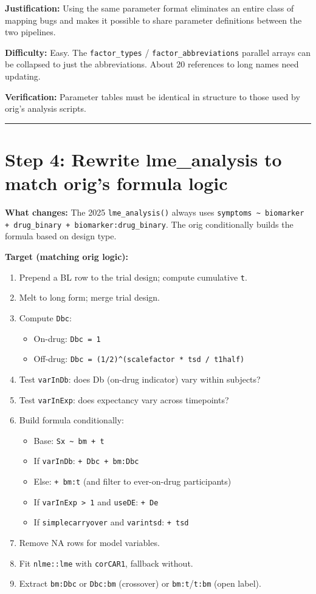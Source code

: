 \documentclass[11pt]{article}
\begin{document}
\textbf{Justification:} Using the same parameter format eliminates an
entire class of mapping bugs and makes it possible to share
parameter definitions between the two pipelines.

\textbf{Difficulty:} Easy. The \texttt{factor\_types} / \texttt{factor\_abbreviations}
parallel arrays can be collapsed to just the abbreviations. About
20 references to long names need updating.

\textbf{Verification:} Parameter tables must be identical in structure
to those used by orig's analysis scripts.

\bigskip\noindent\rule{\textwidth}{0.4pt}\bigskip

\section{Step 4: Rewrite lme\_analysis to match orig's formula logic}

\textbf{What changes:} The 2025 \texttt{lme\_analysis()} always uses
\texttt{symptoms \textasciitilde{} biomarker + drug\_binary + biomarker:drug\_binary}.
The orig conditionally builds the formula based on design type.

\textbf{Target (matching orig logic):}

\begin{enumerate}
  \item Prepend a BL row to the trial design; compute cumulative \texttt{t}.
  \item Melt to long form; merge trial design.
  \item Compute \texttt{Dbc}:
    \begin{itemize}
      \item On-drug: \texttt{Dbc = 1}
      \item Off-drug: \texttt{Dbc = (1/2)\^{}(scalefactor * tsd / t1half)}
    \end{itemize}
  \item Test \texttt{varInDb}: does Db (on-drug indicator) vary within subjects?
  \item Test \texttt{varInExp}: does expectancy vary across timepoints?
  \item Build formula conditionally:
    \begin{itemize}
      \item Base: \texttt{Sx \textasciitilde{} bm + t}
      \item If \texttt{varInDb}: \texttt{+ Dbc + bm:Dbc}
      \item Else: \texttt{+ bm:t} (and filter to ever-on-drug participants)
      \item If \texttt{varInExp > 1} and \texttt{useDE}: \texttt{+ De}
      \item If \texttt{simplecarryover} and \texttt{varintsd}: \texttt{+ tsd}
    \end{itemize}
  \item Remove NA rows for model variables.
  \item Fit \texttt{nlme::lme} with \texttt{corCAR1}, fallback without.
  \item Extract \texttt{bm:Dbc} or \texttt{Dbc:bm} (crossover) or \texttt{bm:t}/\texttt{t:bm}
    (open label).
\end{enumerate}
\end{document}
